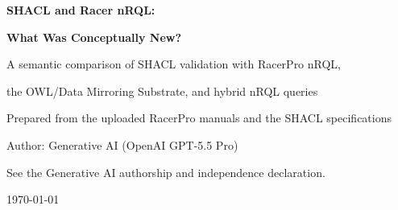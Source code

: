 \documentclass[11pt,letterpaper]{article}
\begin{document}
\begin{titlepage}
  \centering
  \vspace*{1.2in}
  {\LARGE \bfseries SHACL and Racer nRQL:\par}
  \vspace{0.25in}
  {\Large \bfseries What Was Conceptually New?\par}
  \vspace{0.5in}
  {\large A semantic comparison of SHACL validation with RacerPro nRQL,\par}
  {\large the OWL/Data Mirroring Substrate, and hybrid nRQL queries\par}
  \vspace{0.9in}
  {\large Prepared from the uploaded RacerPro manuals and the SHACL specifications\par}
  \vspace{0.45in}
  {\large Author: Generative AI (OpenAI GPT-5.5 Pro)\par}
  \vspace{0.15in}
  {\normalsize See the Generative AI authorship and independence declaration.\par}
  \vfill
  {\large \today\par}
\end{titlepage}
\end{document}
